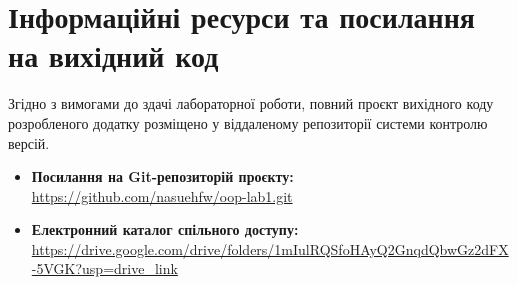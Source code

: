 \newpage
\section{Інформаційні ресурси та посилання на вихідний код}

Згідно з вимогами до здачі лабораторної роботи, повний проєкт вихідного коду розробленого 
додатку розміщено у віддаленому репозиторії системи контролю версій. 

\begin{itemize}
    \item \textbf{Посилання на Git-репозиторій проєкту:} \\
    \url{https://github.com/nasuehfw/oop-lab1.git}
    
    \item \textbf{Електронний каталог спільного доступу:} \\
    \url{https://drive.google.com/drive/folders/1mIulRQSfoHAyQ2GnqdQbwGz2dFX-5VGK?usp=drive\_link}
\end{itemize}
